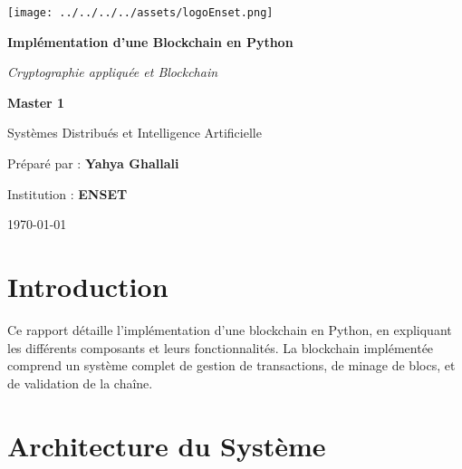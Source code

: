 \documentclass[french]{article}
\begin{document}
\begin{titlepage}
    \centering
    \texttt{[image: ../../../../assets/logoEnset.png]}\par
    \vspace*{1cm}

    {\Huge\bfseries Implémentation d'une Blockchain en Python \par}
    \vspace{0.5cm}
    {\LARGE\itshape Cryptographie appliquée et Blockchain \par}
    \vspace{2cm}

    {\Large\textbf{Master 1}\par}
    \vspace{0.5cm}
    {\large Systèmes Distribués et Intelligence Artificielle \par}
    \vspace{2cm}

    \vfill
    \begin{flushright}
        {\large Préparé par : \textbf{Yahya Ghallali}\par}
        {\large Institution : \textbf{ENSET}\par}
        {\normalsize \today\par}
    \end{flushright}

\end{titlepage}

\tableofcontents
\newpage

\section{Introduction}
Ce rapport détaille l'implémentation d'une blockchain en Python, en expliquant les différents composants et leurs fonctionnalités. La blockchain implémentée comprend un système complet de gestion de transactions, de minage de blocs, et de validation de la chaîne.

\section{Architecture du Système}
\end{document}

